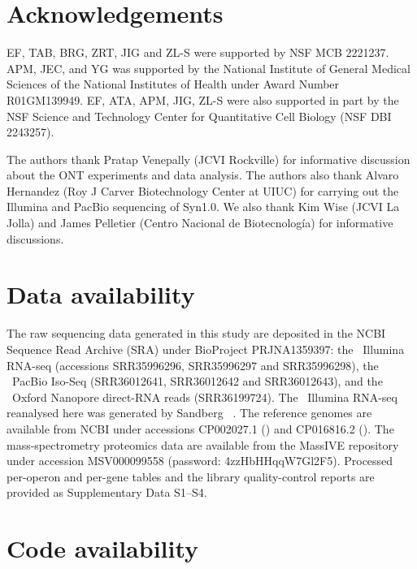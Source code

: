 \section{Acknowledgements}

EF, TAB, BRG, ZRT, JIG and ZL-S were supported by NSF MCB 2221237. 
APM, JEC, and YG was supported by the National Institute of General Medical Sciences of the National Institutes of Health under Award Number R01GM139949.
EF, ATA, APM, JIG, ZL-S were also supported in part by the NSF Science and Technology Center for Quantitative Cell Biology (NSF DBI 2243257).


The authors thank Pratap Venepally (JCVI Rockville) for informative discussion about the ONT experiments and data analysis. The authors also thank Alvaro Hernandez (Roy J Carver Biotechnology Center at UIUC) for carrying out the Illumina and PacBio sequencing of Syn1.0.
We also thank Kim Wise (JCVI La Jolla) and James Pelletier (Centro Nacional de Biotecnología) for informative discussions.

\section*{Data availability}

The raw sequencing data generated in this study are deposited in the NCBI Sequence Read Archive (SRA) under BioProject PRJNA1359397: the \syn~Illumina RNA-seq (accessions SRR35996296, SRR35996297 and SRR35996298), the \syn~PacBio Iso-Seq (SRR36012641, SRR36012642 and SRR36012643), and the \syna~Oxford Nanopore direct-RNA reads (SRR36199724).
The \syna~Illumina RNA-seq reanalysed here was generated by Sandberg \etal~\cite{sandberg_adaptive_2023}.
The reference genomes are available from NCBI under accessions CP002027.1 (\jsyn) and CP016816.2 (\jsyna).
The mass-spectrometry proteomics data are available from the MassIVE repository under accession MSV000099558 (password: 4zzHbHHqqW7Gl2F5).
Processed per-operon and per-gene tables and the library quality-control reports are provided as Supplementary Data S1--S4.

\section*{Code availability}

